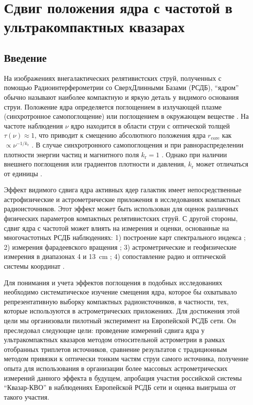 \graphicspath{{Dissertation/images/chapt1/}}


\chapter{Сдвиг положения ядра с частотой в ультракомпактных квазарах} \label{chapt1}

\section{Введение}

На изображениях внегалактических релятивистских струй, полученных с помощью Радиоинтерферометрии со
СверхДлинными Базами (РСДБ), ``ядром'' обычно называют наиболее компактную и яркую деталь у видимого
основания струи. Положение ядра определяется поглощением в излучающей плазме (синхротронное
самопоглощение) или поглощением в окружающем веществе
\cite{Blandford_Konigl_1979,Konigl_1981,Lobanov_1998}. На частоте наблюдения $\nu$ ядро находится в
области струи с оптической толщей $\tau(\nu) \approx 1$, что приводит к смещению абсолютного
положения ядра $r_\text{core}$ как $\propto \nu^{-1/k_{\text{r}}}$ \cite{Lobanov_1998}. В случае
синхротронного самопоглощения и при равнораспределении плотности энергии частиц и магнитного поля
$k_\text{r} = 1$ \cite{Blandford_Konigl_1979}. Однако при наличии внешнего поглощения или
градиентов плотности и давления, $k_\text{r}$ может отличаться от единицы \cite{Lobanov_1998}.

Эффект видимого сдвига ядра активных ядер галактик имеет непосредственные астрофизические и
астрометрические приложения в исследованиях компактных радиоисточников. Этот эффект может быть
использован для оценок различных физических параметров компактных релятивистских струй. С другой
стороны, сдвиг ядра с частотой может влиять на измерения и оценки, основанные на многочастотных РСДБ
наблюдениях: 1) построение карт спектрального индекса \cite{Lobanov_1998,Kovalev_2008}; 2) измерения
фарадеевского вращения \cite{Hovatta_2012,Krav2016,Krav2017}; 3) астрометрические и геофизические
измерения в диапазонах \num{4} и \SI{13}{\cm} \cite{Ma_1998,Petrov_2009}; 4) сопоставление радио и
оптической системы координат \cite{PK_letter2017,KPP2017,PK2017}.

Для понимания и учета эффектов поглощения в подобных исследованиях необходимо систематическое
изучение смещения ядра, которое бы охватывало репрезентативную выборку компактных радиоисточников, в
частности, тех, которые используются в астрометрических приложениях. Для достижения этой цели мы
организовали пилотный эксперимент на Европейской РСДБ сети. Он преследовал следующие цели:
проведение измерений сдвига ядра у ультракомпактных квазаров методом относительной астрометрии в
рамках отобранных триплетов источников, сравнение результатов с традиционным методом
привязки к оптически тонким частям струи самого источника, получение опыта для использования в
организации более массовых астрометрических измерений данного эффекта в будущем, апробация участия
российской системы ``Квазар-КВО'' в наблюдениях Европейской РСДБ сети и оценка выигрыша от такого
участия.

